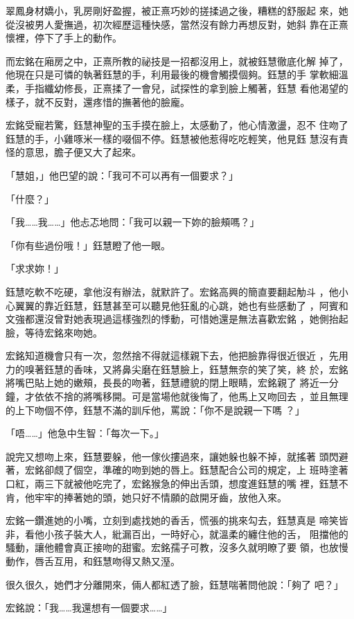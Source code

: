 翠鳳身材嬌小，乳房剛好盈握，被正熹巧妙的搓揉過之後，糟糕的舒服起
來，她從沒被男人愛撫過，初次經歷這種快感，當然沒有餘力再想反對，她斜
靠在正熹懷裡，停下了手上的動作。

而宏銘在廂房之中，正熹所教的祕技是一招都沒用上，就被鈺慧徹底化解
掉了，他現在只是可憐的執著鈺慧的手，利用最後的機會觸摸個夠。鈺慧的手
掌軟細溫柔，手指纖幼修長，正熹揉了一會兒，試探性的拿到臉上觸著，鈺慧
看他渴望的樣子，就不反對，還疼惜的撫著他的臉龐。

宏銘受寵若驚，鈺慧神聖的玉手摸在臉上，太感動了，他心情激盪，忍不
住吻了鈺慧的手，小雞啄米一樣的啜個不停。鈺慧被他惹得吃吃輕笑，他見鈺
慧沒有責怪的意思，膽子便又大了起來。

「慧姐，」他巴望的說：「我可不可以再有一個要求？」

「什麼？」

「我……我……」他忐忑地問：「我可以親一下妳的臉頰嗎？」

「你有些過份哦！」鈺慧瞪了他一眼。

「求求妳！」

鈺慧吃軟不吃硬，拿他沒有辦法，就默許了。宏銘高興的簡直要翻起觔斗
，他小心翼翼的靠近鈺慧，鈺慧甚至可以聽見他狂亂的心跳，她也有些感動了
，阿賓和文強都還沒曾對她表現過這樣強烈的悸動，可惜她還是無法喜歡宏銘
，她側抬起臉，等待宏銘來吻她。

宏銘知道機會只有一次，忽然捨不得就這樣親下去，他把臉靠得很近很近
，先用力的嗅著鈺慧的香味，又將鼻尖磨在鈺慧臉上，鈺慧無奈的笑了笑，終
於，宏銘將嘴巴貼上她的嫩頰，長長的吻著，鈺慧禮貌的閉上眼睛，宏銘親了
將近一分鐘，才依依不捨的將嘴移開。可是當場他就後悔了，他馬上又吻回去
，並且無理的上下吻個不停，鈺慧不滿的訓斥他，罵說：「你不是說親一下嗎
？」

「唔……」他急中生智：「每次一下。」

說完又想吻上來，鈺慧要躲，他一傢伙摟過來，讓她躲也躲不掉，就搖著
頭閃避著，宏銘卻覤了個空，準確的吻到她的唇上。鈺慧配合公司的規定，上
班時塗著口紅，兩三下就被他吃完了，宏銘猴急的伸出舌頭，想度進鈺慧的嘴
裡，鈺慧不肯，他牢牢的捧著她的頭，她只好不情願的啟開牙齒，放他入來。

宏銘一鑽進她的小嘴，立刻到處找她的香舌，慌張的挑來勾去，鈺慧真是
啼笑皆非，看他小孩子裝大人，紕漏百出，一時好心，就溫柔的纏住他的舌，
阻擋他的騷動，讓他體會真正接吻的甜蜜。宏銘孺子可教，沒多久就明瞭了要
領，也放慢動作，唇舌互用，和鈺慧吻得又熱又溼。

很久很久，她們才分離開來，倆人都紅透了臉，鈺慧喘著問他說：「夠了
吧？」

宏銘說：「我……我還想有一個要求……」

